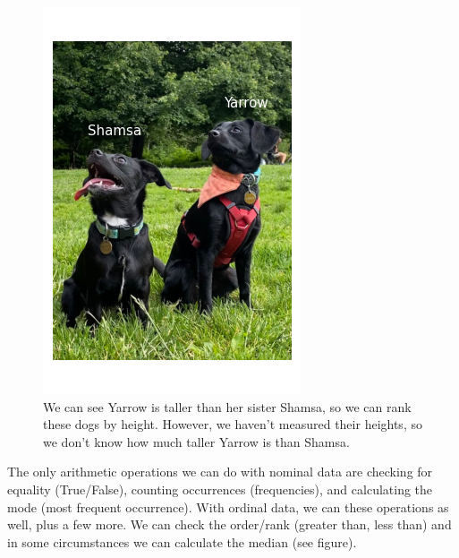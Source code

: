 \documentclass[
]{book}
\begin{document}
\begin{figure}
\centering
\includegraphics{images/03-dogs-ordinal.png}
\caption{We can see Yarrow is taller than her sister Shamsa, so we can rank these dogs by height. However, we haven't measured their heights, so we don't know how much taller Yarrow is than Shamsa.}
\end{figure}

The only arithmetic operations we can do with nominal data are checking for equality (True/False), counting occurrences (frequencies), and calculating the mode (most frequent occurrence). With ordinal data, we can these operations as well, plus a few more. We can check the order/rank (greater than, less than) and in some circumstances we can calculate the median (see figure).
\end{document}

